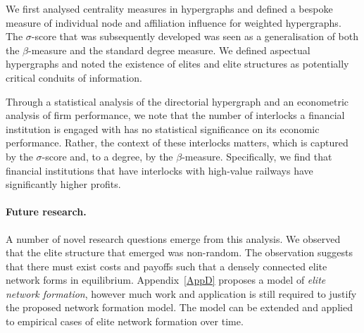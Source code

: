 We first analysed centrality measures in hypergraphs and defined a bespoke measure of individual node and affiliation influence for weighted hypergraphs. The $\sigma$-score that was subsequently developed was seen as a generalisation of both the $\beta$-measure and the standard degree measure. We defined aspectual hypergraphs and noted the existence of elites and elite structures as potentially critical conduits of information.

Through a statistical analysis of the directorial hypergraph and an econometric analysis of firm performance, we note that the number of interlocks a financial institution is engaged with has no statistical significance on its economic performance. Rather, the context of these interlocks matters, which is captured by the $\sigma$-score and, to a degree, by the $\beta$-measure. Specifically, we find that financial institutions that have interlocks with high-value railways have significantly higher profits.

\paragraph{Future research.}

A number of novel research questions emerge from this analysis. We observed that the elite structure that emerged was non-random. The observation suggests that there must exist costs and payoffs such that a densely connected elite network forms in equilibrium. Appendix~\ref{AppD} proposes a model of \emph{elite network formation}, however much work and application is still required to justify the proposed network formation model. The model can be extended and applied to empirical cases of elite network formation over time.


